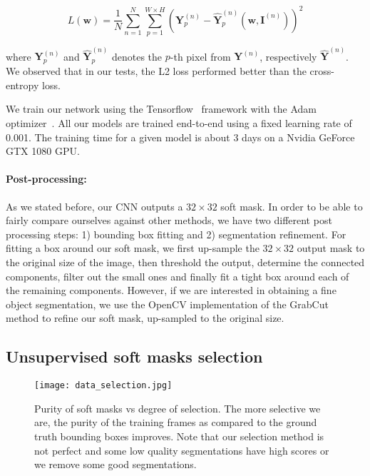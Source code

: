 \documentclass[10pt,twocolumn,letterpaper]{article}
\begin{document}
\begin{equation}
\label{eq:learning}
L(\mathbf{w})=\frac{1}{N}\sum\limits_{n=1}^N \sum\limits_{p=1}^{W\times H}{(\mathbf{Y}_{p}^{(n)} - \mathbf{\hat{Y}}_{p}^{(n)}(\mathbf{w}, \mathbf{I}^{(n)}))}^2
\end{equation}

where $\mathbf{Y}_{p}^{(n)}$ and $\mathbf{\hat{Y}}_{p}^{(n)}$ denotes the $p$-th pixel from $\mathbf{Y}^{(n)}$, respectively $\mathbf{\hat{Y}}^{(n)}$. We observed that in our tests, the L2 loss performed better than the cross-entropy loss.

We train our network using the Tensorflow~\cite{abaditensorflow} framework 
with the Adam optimizer~\cite{kingma2014adam}. All our models are trained 
end-to-end using a fixed learning rate of 0.001. The training time for a
given model is about 3 days on a Nvidia GeForce GTX 1080 GPU.

\paragraph{Post-processing:}As we stated before, our CNN outputs a $32\times32$ soft mask. In order to be able to fairly compare ourselves against other methods, we have two different post processing steps: 1) bounding box fitting and 2) segmentation refinement. For fitting a box around our soft mask, we first up-sample the $32\times32$ output mask to the original size of the image, then threshold the output, determine the connected components, filter out the small ones and finally fit a tight box around each of the remaining components. 
However, if we are interested in obtaining a fine object segmentation, we use the OpenCV implementation of the GrabCut~\cite{rother2004grabcut} method to refine our soft mask, up-sampled to the original size.

\subsection{Unsupervised soft masks selection}\label{sec:data_selection}

\begin{figure}[t]
\begin{center}
   \texttt{[image: data\_selection.jpg]}
\end{center}
   \caption{Purity of soft masks vs degree of selection. The more selective we are, the purity of the training frames as compared to the ground truth bounding boxes improves. Note that our selection method is not perfect and some low quality segmentations have high scores or we remove some good segmentations.}
\label{fig:data_augmentation}
\end{figure}
\end{document}
